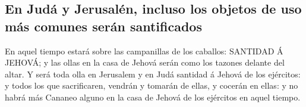 \hypertarget{en-juduxe1-y-jerusaluxe9n-incluso-los-objetos-de-uso-muxe1s-comunes-seruxe1n-santificados}{%
\subsection{En Judá y Jerusalén, incluso los objetos de uso más comunes
serán
santificados}\label{en-juduxe1-y-jerusaluxe9n-incluso-los-objetos-de-uso-muxe1s-comunes-seruxe1n-santificados}}

 En aquel tiempo estará sobre las campanillas de los
caballos: SANTIDAD Á JEHOVÁ; y las ollas en la casa de Jehová serán como
los tazones delante del altar.  Y será toda olla en
Jerusalem y en Judá santidad á Jehová de los ejércitos: y todos los que
sacrificaren, vendrán y tomarán de ellas, y cocerán en ellas: y no habrá
más Cananeo alguno en la casa de Jehová de los ejércitos en aquel
tiempo.
